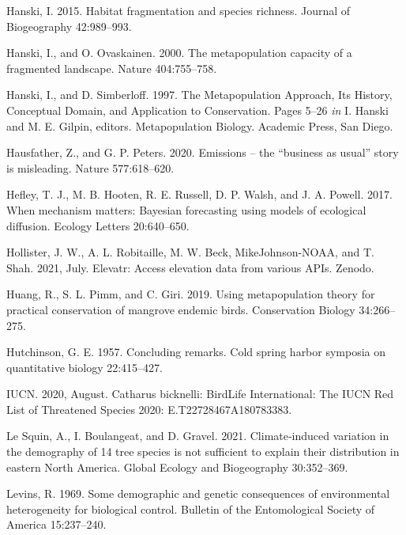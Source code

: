 \documentclass[12pt]{article}
\newlength{\cslhangindent}
\newenvironment{cslreferences}%
  {\setlength{\parindent}{0pt}%
  \everypar{\setlength{\hangindent}{\cslhangindent}}\ignorespaces}%
  {\par}
\begin{document}
\begin{cslreferences}
\leavevmode\hypertarget{ref-hanski_habitat_2015}{}%
Hanski, I. 2015. Habitat fragmentation and species richness. Journal of
Biogeography 42:989--993.

\leavevmode\hypertarget{ref-hanski_metapopulation_2000}{}%
Hanski, I., and O. Ovaskainen. 2000. The metapopulation capacity of a
fragmented landscape. Nature 404:755--758.

\leavevmode\hypertarget{ref-hanski_metapopulation_1997}{}%
Hanski, I., and D. Simberloff. 1997. The Metapopulation Approach, Its
History, Conceptual Domain, and Application to Conservation. Pages 5--26
\emph{in} I. Hanski and M. E. Gilpin, editors. Metapopulation Biology.
Academic Press, San Diego.

\leavevmode\hypertarget{ref-hausfather_emissions_2020}{}%
Hausfather, Z., and G. P. Peters. 2020. Emissions -- the ``business as
usual'' story is misleading. Nature 577:618--620.

\leavevmode\hypertarget{ref-hefley_when_2017}{}%
Hefley, T. J., M. B. Hooten, R. E. Russell, D. P. Walsh, and J. A.
Powell. 2017. When mechanism matters: Bayesian forecasting using models
of ecological diffusion. Ecology Letters 20:640--650.

\leavevmode\hypertarget{ref-hollister_elevatr_2021}{}%
Hollister, J. W., A. L. Robitaille, M. W. Beck, MikeJohnson-NOAA, and T.
Shah. 2021, July. Elevatr: Access elevation data from various APIs.
Zenodo.

\leavevmode\hypertarget{ref-huang_using_2019}{}%
Huang, R., S. L. Pimm, and C. Giri. 2019. Using metapopulation theory
for practical conservation of mangrove endemic birds. Conservation
Biology 34:266--275.

\leavevmode\hypertarget{ref-hutchinson_concluding_1957}{}%
Hutchinson, G. E. 1957. Concluding remarks. Cold spring harbor symposia
on quantitative biology 22:415--427.

\leavevmode\hypertarget{ref-iucn_catharus_2020}{}%
IUCN. 2020, August. Catharus bicknelli: BirdLife International: The IUCN
Red List of Threatened Species 2020: E.T22728467A180783383.

\leavevmode\hypertarget{ref-le_squin_climateinduced_2021}{}%
Le Squin, A., I. Boulangeat, and D. Gravel. 2021. Climate‐induced
variation in the demography of 14 tree species is not sufficient to
explain their distribution in eastern North America. Global Ecology and
Biogeography 30:352--369.

\leavevmode\hypertarget{ref-levins_demographic_1969}{}%
Levins, R. 1969. Some demographic and genetic consequences of
environmental heterogeneity for biological control. Bulletin of the
Entomological Society of America 15:237--240.


\end{cslreferences}
\end{document}
